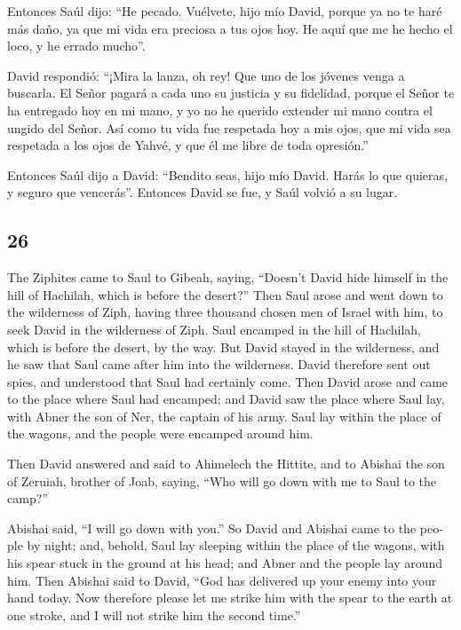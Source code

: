 \begin{paracol}{2}
 Entonces Saúl dijo: ``He pecado. Vuélvete, hijo mío
David, porque ya no te haré más daño, ya que mi vida era preciosa a tus
ojos hoy. He aquí que me he hecho el loco, y he errado mucho''.

 David respondió: ``¡Mira la lanza, oh rey! Que uno de
los jóvenes venga a buscarla.  El Señor pagará a cada uno
su justicia y su fidelidad, porque el Señor te ha entregado hoy en mi
mano, y yo no he querido extender mi mano contra el ungido del Señor.
 Así como tu vida fue respetada hoy a mis ojos, que mi
vida sea respetada a los ojos de Yahvé, y que él me libre de toda
opresión.''

 Entonces Saúl dijo a David: ``Bendito seas, hijo mío
David. Harás lo que quieras, y seguro que vencerás''. Entonces David se
fue, y Saúl volvió a su lugar.

\switchcolumn
\begin{otherlanguage}{english}

\hypertarget{section-51}{%
\section{26}\label{section-51}}

 The Ziphites came to Saul to Gibeah, saying, ``Doesn't
David hide himself in the hill of Hachilah, which is before the
desert?''  Then Saul arose and went down to the wilderness
of Ziph, having three thousand chosen men of Israel with him, to seek
David in the wilderness of Ziph.  Saul encamped in the
hill of Hachilah, which is before the desert, by the way. But David
stayed in the wilderness, and he saw that Saul came after him into the
wilderness.  David therefore sent out spies, and
understood that Saul had certainly come.  Then David arose
and came to the place where Saul had encamped; and David saw the place
where Saul lay, with Abner the son of Ner, the captain of his army. Saul
lay within the place of the wagons, and the people were encamped around
him.

 Then David answered and said to Ahimelech the Hittite,
and to Abishai the son of Zeruiah, brother of Joab, saying, ``Who will
go down with me to Saul to the camp?''

Abishai said, ``I will go down with you.''  So David and
Abishai came to the people by night; and, behold, Saul lay sleeping
within the place of the wagons, with his spear stuck in the ground at
his head; and Abner and the people lay around him.  Then
Abishai said to David, ``God has delivered up your enemy into your hand
today. Now therefore please let me strike him with the spear to the
earth at one stroke, and I will not strike him the second time.''


\end{otherlanguage}
\end{paracol}
